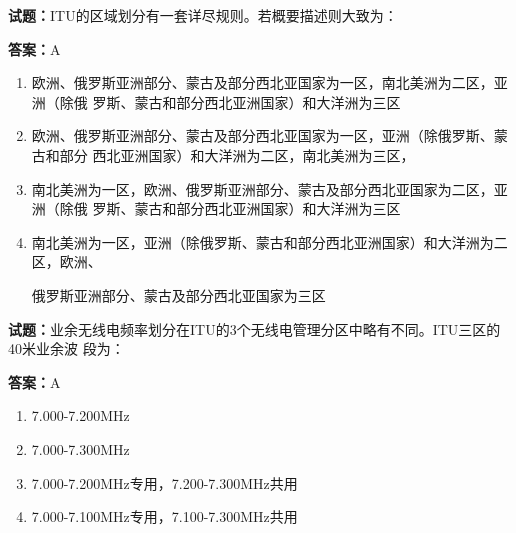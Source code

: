 \documentclass{ctexbook}
\begin{document}




\vspace{1em}

\textbf{试题：}ITU的区域划分有一套详尽规则。若概要描述则大致为： 

\textbf{答案：}A 

\begin{enumerate}[leftmargin=3em]
  \item 欧洲、俄罗斯亚洲部分、蒙古及部分西北亚国家为一区，南北美洲为二区，亚洲（除俄
罗斯、蒙古和部分西北亚洲国家）和大洋洲为三区 

  \item 欧洲、俄罗斯亚洲部分、蒙古及部分西北亚国家为一区，亚洲（除俄罗斯、蒙古和部分
西北亚洲国家）和大洋洲为二区，南北美洲为三区， 

  \item 南北美洲为一区，欧洲、俄罗斯亚洲部分、蒙古及部分西北亚国家为二区，亚洲（除俄
罗斯、蒙古和部分西北亚洲国家）和大洋洲为三区 

  \item 南北美洲为一区，亚洲（除俄罗斯、蒙古和部分西北亚洲国家）和大洋洲为二区，欧洲、


俄罗斯亚洲部分、蒙古及部分西北亚国家为三区 

\end{enumerate}





\vspace{1em}

\textbf{试题：}业余无线电频率划分在ITU的3个无线电管理分区中略有不同。ITU三区的40米业余波
段为： 

\textbf{答案：}A 

\begin{enumerate}[leftmargin=3em]
  \item 7.000-7.200MHz 

  \item 7.000-7.300MHz 

  \item 7.000-7.200MHz专用，7.200-7.300MHz共用 

  \item 7.000-7.100MHz专用，7.100-7.300MHz共用 

\end{enumerate}

\end{document}
